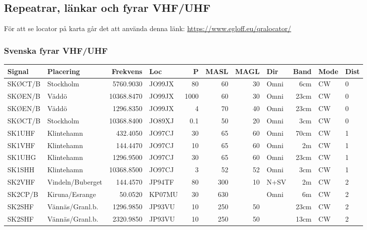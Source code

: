 \subsection{Repeatrar, länkar och fyrar VHF/UHF}
För att se locator på karta går det att använda denna länk: \href{https://www.egloff.eu/qralocator/}{https://www.egloff.eu/qralocator/}
\subsubsection{Svenska fyrar VHF/UHF}
\scriptsize
\begin{longtable}{llrlrrrlrll}
	Signal   & Placering           &   Frekvens & Loc    &    P & MASL & MAGL & Dir     &  Band & Mode   & Dist \\ \hline
	SKØCT/B  & Stockholm           &  5760.9030 & JO99JX &   80 &   60 &   30 & Omni    &   6cm & CW     & 0    \\
	SKØEN/B  & Väddö               & 10368.8470 & JO99JX & 1000 &   60 &   30 & Omni    &  23cm & CW     & 0    \\
	SKØEN/B  & Väddö               &  1296.8350 & JO99JX &    4 &   70 &   40 & Omni    &  23cm & CW     & 0    \\
	SKØCT/B  & Stockholm           & 10368.8400 & JO89XJ &  0.1 &   50 &   20 & Omni    &   3cm & CW     & 0    \\
	SK1UHF   & Klintehamn          &   432.4050 & JO97CJ &   30 &   65 &   60 & Omni    &  70cm & CW     & 1    \\
	SK1VHF   & Klintehamn          &   144.4470 & JO97CJ &   10 &   65 &   60 & Omni    &    2m & CW     & 1    \\
	SK1UHG   & Klintehamn          &  1296.9500 & JO97CJ &   30 &   65 &   60 & Omni    &  23cm & CW     & 1    \\
	SK1SHH   & Klintehamn          & 10368.8500 & JO97CJ &    3 &   52 &   52 & Omni    &   3cm & CW     & 1    \\
	SK2VHF   & Vindeln/Buberget    &   144.4570 & JP94TF &   80 &  300 &   10 & N+SV    &    2m & CW     & 2    \\
	SK2CP/B  & Kiruna/Esrange      &    50.0520 & KP07MU &   30 &  630 &      & Omni    &    6m & CW     & 2    \\
	SK2SHF   & Vännäs/Granl.b.     &  1296.9850 & JP93VU &   10 &  250 &   50 &         &  23cm & CW     & 2    \\
	SK2SHF   & Vännäs/Granl.b.     &  2320.9850 & JP93VU &   10 &  250 &   50 &         &  13cm & CW     & 2    \\

\end{longtable}
